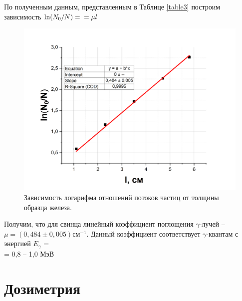 \documentclass[a4paper,12pt]{article}
\begin{document}
По полученным данным, представленным в Таблице \ref{table3} построим зависимость $\ln(N_0/N) = \\ =\mu l$

\begin{figure}[h]
	\includegraphics[width=\linewidth]{graph3(Fe)} 
	\caption{Зависимость логарифма отношений потоков частиц от толщины образца железа.}
	\label{Fe}
\end{figure}

Получим, что для свинца линейный коэффициент поглощения $\gamma$-лучей -- \\ $\mu = (0,484 \pm 0,005) см^{-1}$. Данный коэффициент соответствует $\gamma$-квантам с энергией $E_{\gamma}$ = \\ = 0,8 -- 1,0 МэВ 

\newpage

\section*{Дозиметрия}
\end{document}

